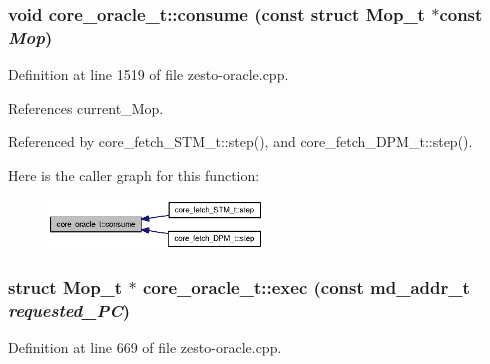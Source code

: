 \subsubsection[{consume}]{\setlength{\rightskip}{0pt plus 5cm}void core\_\-oracle\_\-t::consume (const struct {\bf Mop\_\-t} $\ast$const  {\em Mop})}\label{classcore__oracle__t_527c3d85c2b86a3fed4c223b529dd33f}




Definition at line 1519 of file zesto-oracle.cpp.

References current\_\-Mop.

Referenced by core\_\-fetch\_\-STM\_\-t::step(), and core\_\-fetch\_\-DPM\_\-t::step().

Here is the caller graph for this function:\nopagebreak
\begin{figure}[H]
\begin{center}
\leavevmode
\includegraphics[width=161pt]{classcore__oracle__t_527c3d85c2b86a3fed4c223b529dd33f_icgraph}
\end{center}
\end{figure}
\subsubsection[{exec}]{\setlength{\rightskip}{0pt plus 5cm}struct {\bf Mop\_\-t} $\ast$ core\_\-oracle\_\-t::exec (const {\bf md\_\-addr\_\-t} {\em requested\_\-PC})\hspace{0.3cm}{\tt  [read]}}\label{classcore__oracle__t_1ac2b1204cef575e22d1d03c3ce4cff9}




Definition at line 669 of file zesto-oracle.cpp.

